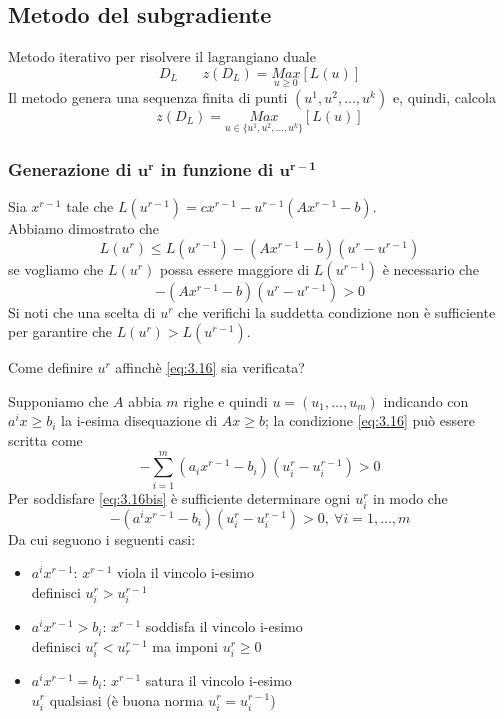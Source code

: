 \subsection{Metodo del subgradiente}
Metodo iterativo per risolvere il lagrangiano duale
\begin{equation*}
	D_{L}\ \ \ \ \ \ \ \ z(D_{L})=\underset{u\ge 0}{Max}[L(u)]
\end{equation*}
Il metodo genera una sequenza finita di punti $(u^{1},u^{2},\dots,u^{k})$ e, quindi, calcola
\begin{equation*}
	z(D_{L})=\underset{u\in \{u^{1},u^{2},\dots,u^{k}\}}{Max}[L(u)]
\end{equation*}
\subsubsection{Generazione di $\boldsymbol{u^{r}}$ in funzione di $\boldsymbol{u^{r-1}}$}
Sia $x^{r-1}$ tale che $L(u^{r-1})=cx^{r-1}-u^{r-1}(Ax^{r-1}-b)$.\\
Abbiamo dimostrato che
\begin{equation*}
	L(u^{r})\le L(u^{r-1})-(Ax^{r-1}-b)(u^{r}-u^{r-1})
\end{equation*}
se vogliamo che $L(u^{r})$ possa essere maggiore di $L(u^{r-1})$ è necessario che
\begin{equation}
	-(Ax^{r-1}-b)(u^{r}-u^{r-1})>0 \label{eq:3.16}
\end{equation}
Si noti che una scelta di $u^{r}$ che verifichi la suddetta condizione non è sufficiente per garantire che $L(u^{r})>L(u^{r-1})$.

Come definire $u^{r}$ affinchè \ref{eq:3.16} sia verificata?

Supponiamo che $A$ abbia $m$ righe e quindi $u=(u_{1},\dots,u_{m})$ indicando con $a^{i}x\ge b_{i}$ la i-esima disequazione di $Ax\ge b$; la condizione \ref{eq:3.16} può essere scritta come
\begin{equation}
	-\sum_{i=1}^{m}(a_{i}x^{r-1}-b_{i})(u_{i}^{r}-u_{i}^{r-1})>0 \label{eq:3.16bis}
\end{equation}
Per soddisfare \ref{eq:3.16bis} è sufficiente determinare ogni $u_{i}^{r}$ in modo che
\begin{equation*}
	-(a^{i}x^{r-1}-b_{i})(u_{i}^{r}-u_{i}^{r-1})>0,\ \forall i=1,\dots,m
\end{equation*}
Da cui seguono i seguenti casi:

\begin{itemize}
	\item $a^{i}x^{r-1}$: $x^{r-1}$ viola il vincolo i-esimo \\
	definisci $u_{i}^{r}>u_{i}^{r-1}$
	\item $a^{i}x^{r-1}>b_{i}$: $x^{r-1}$ soddisfa il vincolo i-esimo \\
	definisci $u_{i}^{r}<u_{r}^{r-1}$ ma imponi $u_{i}^{r}\ge 0$
	\item $a^{i}x^{r-1}=b_{i}$: $x^{r-1}$ satura il vincolo i-esimo \\
	$u_{i}^{r}$ qualsiasi (è buona norma $u_{i}^{r}=u_{i}^{r-1}$)
\end{itemize}
